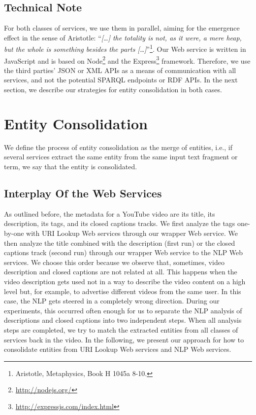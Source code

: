 \documentclass{acm_proc_article-sp}
\begin{document}
\subsection{Technical Note}                                                 \label{sec:technicalnote}
For both classes of services, we use them in parallel, aiming for the emergence effect in the sense of Aristotle:
``\emph{[\ldots] the totality is not, as it were, a mere heap, but the whole is something besides the parts
[\ldots]}''\footnote{Aristotle, Metaphysics, Book H 1045a 8-10.}. Our Web service is written in JavaScript and is based
on Node\footnote{\url{http://nodejs.org/}} and the Express\footnote{\url{http://expressjs.com/index.html}} framework.
Therefore, we use the third parties' JSON or XML APIs as a means of communication with all services, and not the
potential SPARQL endpoints or RDF APIs. In the next section, we describe our strategies for entity consolidation in
both cases.


\section{Entity Consolidation}                                              \label{sec:consolidation}
We define the process of entity consolidation as the merge of entities, i.e., if several services extract the same
entity from the same input text fragment or term, we say that the entity is consolidated.

\subsection{Interplay Of the Web Services}                                  \label{sec:interplay}
As outlined before, the metadata for a YouTube video are its title, its description, its tags, and its closed captions
tracks. We first analyze the tags one-by-one with URI Lookup Web services through our wrapper Web service. We then
analyze the title combined with the description (first run) or the closed captions track (second run) through our
wrapper Web service to the NLP Web services. We choose this order because we observe that, sometimes, video description
and closed captions are not related at all. This happens when the video description gets used not in a way to describe
the video content on a high level but, for example, to advertise different videos from the same user. In this case, the
NLP gets steered in a completely wrong direction. During our experiments, this occurred often enough for us to separate
the NLP analysis of descriptions and closed captions into two independent steps. When all analysis steps are completed,
we try to match the extracted entities from all classes of services back in the video. In the following, we present our
approach for how to consolidate entities from URI Lookup Web services and NLP Web services.
\end{document}
